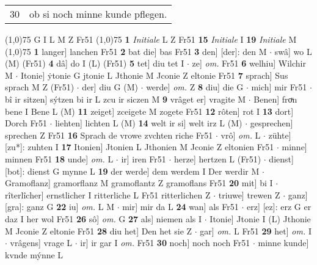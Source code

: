 \documentclass[8pt,a4paper,notitlepage]{article}
\begin{document}
\begin{table}[ht]
\begin{minipage}[t]{0.5\linewidth}
\begin{tabular}{rl}
30 & ob si noch minne kunde pflegen.\\ 
\end{tabular}
\scriptsize
\line(1,0){75} \newline
G I L M Z Fr51 \newline
\line(1,0){75} \newline
\textbf{1} \textit{Initiale} L Z Fr51  \textbf{15} \textit{Initiale} I  \textbf{19} \textit{Initiale} M  \newline
\line(1,0){75} \newline
\textbf{1} langer] lanchen Fr51 \textbf{2} bat die] bas Fr51 \textbf{3} den] [der]: den M  $\cdot$ swâ] wo L (M) (Fr51) \textbf{4} dâ] do I (L) (Fr51) \textbf{5} tet] diu tet I  $\cdot$ ze] \textit{om.} Fr51 \textbf{6} welhiu] Wilchir M  $\cdot$ Itonie] ẏtonie G jtonie L Jthonie M Jconie Z eltonie Fr51 \textbf{7} sprach] Sus sprach M Z (Fr51)  $\cdot$ der] diu G (M)  $\cdot$ werde] \textit{om.} Z \textbf{8} diu] die G  $\cdot$ mich] mir Fr51  $\cdot$ bî ir sitzen] sýtzen bi ir L zcu ir siczen M \textbf{9} vrâget er] vragite M  $\cdot$ Benen] froͮn bene I Bene L (M) \textbf{11} zeiget] zceigete M zogete Fr51 \textbf{12} rôten] rot I \textbf{13} dort] Dorch Fr51  $\cdot$ liehten] lichten L (M) \textbf{14} welt ir si] welt irz L (M)  $\cdot$ gesprechen] sprechen Z Fr51 \textbf{16} Sprach de vrowe zvchten riche Fr51  $\cdot$ vrô] \textit{om.} L  $\cdot$ zühte] [zu*]: zuhten I \textbf{17} Itonien] Jtonien L Jthonien M Jconie Z eltonien Fr51  $\cdot$ minne] minnen Fr51 \textbf{18} unde] \textit{om.} L  $\cdot$ ir] iren Fr51  $\cdot$ herze] hertzen L (Fr51)  $\cdot$ dienst] [bot]: dienst G mynne L \textbf{19} der werde] dem werdem I Der werdir M  $\cdot$ Gramoflanz] gramorflanz M gramoflantz Z gramoflans Fr51 \textbf{20} mit] bi I  $\cdot$ rîterlîcher] ernstlicher I ritterliche L Fr51 ritterlichen Z  $\cdot$ triuwe] trewen Z  $\cdot$ ganz] [gra]: ganz G \textbf{22} iu] \textit{om.} L M  $\cdot$ mir] mir da L \textbf{24} wan] als Fr51  $\cdot$ erz] [ez]: erz G er daz I her wol Fr51 \textbf{26} sô] \textit{om.} G \textbf{27} als] niemen als I  $\cdot$ Itonie] Jtonie I (L) Jthonie M Jconie Z eltonie Fr51 \textbf{28} diu het] Den het sie Z  $\cdot$ gar] \textit{om.} L Fr51 \textbf{29} het] \textit{om.} I  $\cdot$ vrâgens] vrage L  $\cdot$ ir] ir gar I \textit{om.} Fr51 \textbf{30} noch] noch noch Fr51  $\cdot$ minne kunde] kvnde mýnne L \newline
\end{minipage}
\hspace{0.5cm}
\begin{minipage}[t]{0.5\linewidth}

\end{minipage}
\end{table}
\end{document}
